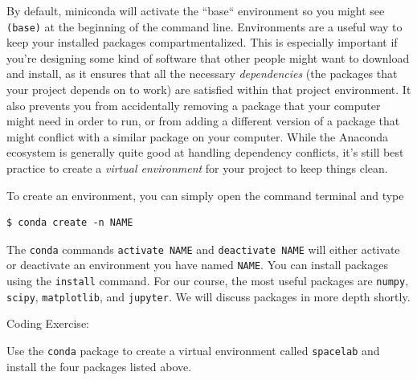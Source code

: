 \documentclass{tufte-book}
\begin{document}
{By default}, miniconda will activate the ``base`` environment so you might see \verb|(base)| at the beginning of the command line. Environments are a useful way to keep your installed packages compartmentalized. This is especially important if you're designing some kind of software that other people might want to download and install, as it ensures that all the necessary \textit{dependencies} (the packages that your project depends on to work) are satisfied within that project environment. It also prevents you from accidentally removing a package that your computer might need in order to run, or from adding a different version of a package that might conflict with a similar package on your computer. While the Anaconda ecosystem is generally quite good at handling dependency conflicts, it's still best practice to create a \textit{virtual environment} for your project to keep things clean. 

To create an environment, you can simply open the command terminal and type 

\begin{lstlisting}[backgroundcolor=\color{lightgray}]
$ conda create -n NAME
\end{lstlisting}

The \verb|conda| commands \verb|activate NAME| and \verb|deactivate NAME| will either activate or deactivate an environment you have named \verb|NAME|. You can install packages using the \verb|install| command. For our course, the most useful packages are \texttt{numpy}, \texttt{scipy}, \texttt{matplotlib}, and \texttt{jupyter}. We will discuss packages in more depth shortly.

\begin{tcolorbox}[sharp corners=all, colback=white!75!green]

Coding Exercise:

Use the \verb|conda| package to create a virtual environment called \verb|spacelab| and install the four packages listed above.

\end{tcolorbox} 



\end{document}
